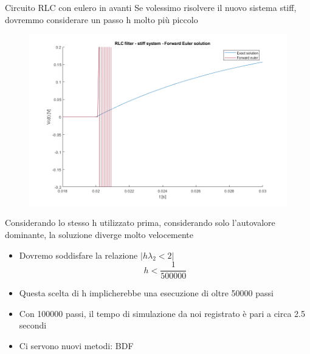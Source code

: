 \documentclass[aspectratio=169, 10pt, handout,usenames,dvipsnames]{beamer}
\begin{document}
\begin{frame}{Circuito RLC con eulero in avanti}
Se volessimo risolvere il nuovo sistema \alert{stiff}, dovremmo considerare un passo h molto più piccolo
\begin{multicols}{2}
        \begin{figure}
        \centering
        \includegraphics[width=1\linewidth]{rlc_forward_euler.png}
        \label{fig:my_label}
        \end{figure}
        \begin{centering}
            Considerando lo stesso h utilizzato prima, considerando solo l'autovalore dominante, la soluzione diverge molto velocemente
        \end{centering}
        \columnbreak
        \begin{itemize}
    \item Dovremo soddisfare la relazione \( | h \lambda_2 < 2 | \) \[h < \dfrac{1}{500000} \]
    \item Questa scelta di h implicherebbe una esecuzione di oltre \alert{50000} passi
    \item Con 100000 passi, il tempo di simulazione da noi registrato è pari a circa 2.5 secondi

\item Ci servono nuovi metodi: BDF

\end{itemize}
\end{multicols}

\end{frame}
\end{document}
